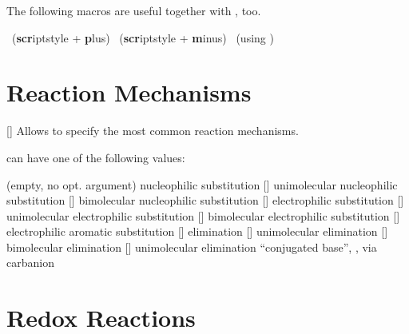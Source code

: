 \documentclass[load-preamble+]{cnltx-doc}
\begin{document}
The following macros are useful together with , too.
\begin{commands}
   \scrp\ (\textbf{scr}iptstyle + \textbf{p}lus)
   \scrm\ (\textbf{scr}iptstyle + \textbf{m}inus)
   \fscrp
   \fscrm
   \fsscrp\ (using )
   \fsscrm
\end{commands}

\begin{example}
  \setatomsep{1.8em}
  
\end{example}

\section{Reaction Mechanisms}\label{sec:mechanismen}

\begin{commands}
  []
    Allows to specify the most common reaction mechanisms.
\end{commands}
 can have one of the following values:
\begin{commands}
    (empty, no opt. argument) nucleophilic substitution \mech
  []
    unimolecular nucleophilic substitution \mech[1]
  []
    bimolecular nucleophilic substitution \mech[2]
  []
    electrophilic substitution \mech[se]
  []
    unimolecular electrophilic substitution \mech[1e]
  []
    bimolecular electrophilic substitution \mech[2e]
  []
    electrophilic aromatic substitution \mech[ar]
  []
    elimination \mech[e]
  []
    unimolecular elimination \mech[e1]
  []
    bimolecular elimination \mech[e2]
  []
    unimolecular elimination \enquote{conjugated base}, \ie, via carbanion
    \mech[cb]
\end{commands}

\section{Redox Reactions}\label{sec:redoxreaktionen}%
\end{document}
